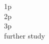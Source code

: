 \question[3]
\label{q:}

\begin{solution}
    \begin{description}
        \item[1p] %
        \item[2p] %
        \item[3p] %
        \item[further study] %
    \end{description}

\end{solution}